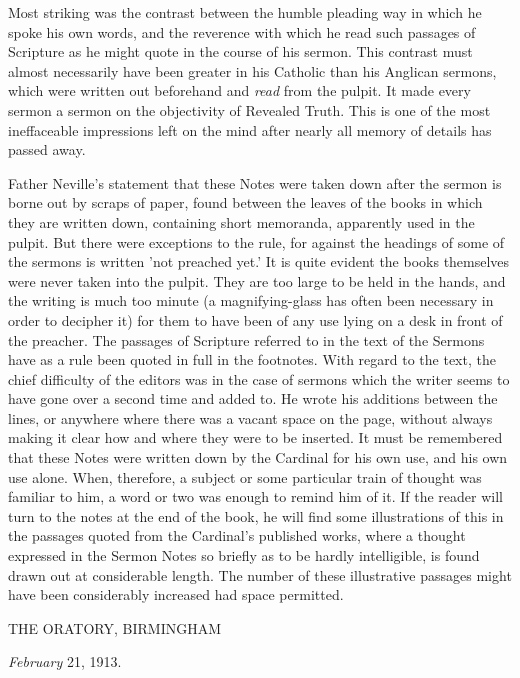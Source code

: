 Most striking was the contrast between the humble
pleading way in which he spoke his own words, and the reverence with
which he read such passages of Scripture as he might quote in the
course of his sermon. This contrast must almost necessarily have been
greater in his Catholic than his Anglican sermons, which were written
out beforehand and \emph{read} from the pulpit. It made every sermon a
sermon on the objectivity of Revealed Truth. This is one of the most
ineffaceable impressions left on the mind after nearly all memory of
details has passed away.

Father Neville's statement that these Notes were
taken down after the sermon is borne out by scraps of paper, found
between the leaves of the books in which they are written down,
containing short memoranda, apparently used in the pulpit. But there
were exceptions to the rule, for against the headings of some of the
sermons is written 'not preached yet.' It is quite evident the books
themselves were never taken into the pulpit. They are too large to be
held in the hands, and the writing is much too minute (a
magnifying-glass has often been necessary in order to decipher
it) for them to have been of any use lying on a desk in front of the
preacher. The passages of Scripture referred to in the text of the
Sermons have as a rule been quoted in full in the footnotes. With
regard to the text, the chief difficulty of the editors was in the
case of sermons which the writer seems to have gone over a second time
and added to. He wrote his additions between the lines, or anywhere
where there was a vacant space on the page, without always making it
clear how and where they were to be inserted. It must be remembered
that these Notes were written down by the Cardinal for his own use,
and his own use alone. When, therefore, a subject or some particular
train of thought was familiar to him, a word or two was enough to
remind him of it. If the reader will turn to the notes at the end of
the book, he will find some illustrations of this in the passages
quoted from the Cardinal's published works, where a thought expressed
in the Sermon Notes so briefly as to be hardly intelligible, is found
drawn out at considerable length. The number of these illustrative
passages might have been considerably increased had space permitted.

THE ORATORY,
BIRMINGHAM

\emph{February} 21, 1913.



